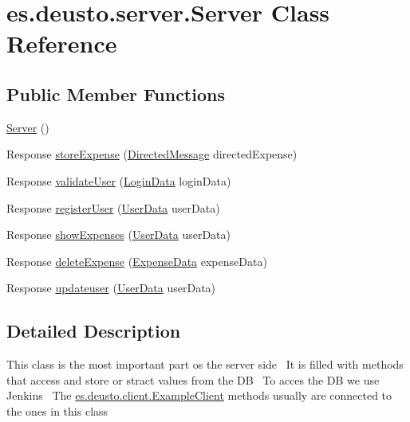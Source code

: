 \hypertarget{classes_1_1deusto_1_1server_1_1_server}{}\section{es.\+deusto.\+server.\+Server Class Reference}
\label{classes_1_1deusto_1_1server_1_1_server}
\subsection*{Public Member Functions}
\begin{DoxyCompactItemize}
\item 
\hyperlink{classes_1_1deusto_1_1server_1_1_server_a84f78162a65dd737f224eb2f94c43023}{Server} ()
\item 
Response \hyperlink{classes_1_1deusto_1_1server_1_1_server_a1a91c5bde8d3b39fc4292dc09d62b61b}{store\+Expense} (\hyperlink{classes_1_1deusto_1_1serialization_1_1_directed_message}{Directed\+Message} directed\+Expense)
\item 
Response \hyperlink{classes_1_1deusto_1_1server_1_1_server_a6e5f5013058ddaf970b0b21da2e32f66}{validate\+User} (\hyperlink{classes_1_1deusto_1_1serialization_1_1_login_data}{Login\+Data} login\+Data)
\item 
Response \hyperlink{classes_1_1deusto_1_1server_1_1_server_a12f56d7a970c3c41fefe8ed2db835c0a}{register\+User} (\hyperlink{classes_1_1deusto_1_1serialization_1_1_user_data}{User\+Data} user\+Data)
\item 
Response \hyperlink{classes_1_1deusto_1_1server_1_1_server_aa28b04cc2643cf60072fc2a680288cde}{show\+Expenses} (\hyperlink{classes_1_1deusto_1_1serialization_1_1_user_data}{User\+Data} user\+Data)
\item 
Response \hyperlink{classes_1_1deusto_1_1server_1_1_server_aa9fc28b2ce1a31d8176a23768e48f173}{delete\+Expense} (\hyperlink{classes_1_1deusto_1_1serialization_1_1_expense_data}{Expense\+Data} expense\+Data)
\item 
Response \hyperlink{classes_1_1deusto_1_1server_1_1_server_aae24e983f2b93173ee25d366a522a936}{updateuser} (\hyperlink{classes_1_1deusto_1_1serialization_1_1_user_data}{User\+Data} user\+Data)
\end{DoxyCompactItemize}


\subsection{Detailed Description}
This class is the most important part os the server side~\newline
 It is filled with methods that access and store or stract values from the DB~\newline
 To acces the DB we use Jenkins~\newline
 The \hyperlink{classes_1_1deusto_1_1client_1_1_example_client}{es.\+deusto.\+client.\+Example\+Client} methods usually are connected to the ones in this class 

